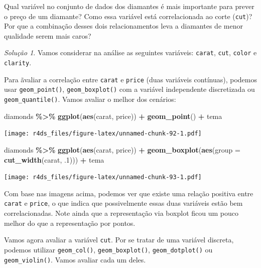 \documentclass[
]{latex/krantz}
\newenvironment{Shaded}{\begin{snugshade}}{\end{snugshade}}
\newcommand{\AttributeTok}[1]{\textcolor[rgb]{0.13,0.29,0.53}{#1}}
\newcommand{\DecValTok}[1]{\textcolor[rgb]{0.00,0.00,0.81}{#1}}
\newcommand{\FunctionTok}[1]{\textcolor[rgb]{0.13,0.29,0.53}{\textbf{#1}}}
\newcommand{\NormalTok}[1]{#1}
\newcommand{\SpecialCharTok}[1]{\textcolor[rgb]{0.81,0.36,0.00}{\textbf{#1}}}
\theoremstyle{definition}
\theoremstyle{definition}
\theoremstyle{definition}
\theoremstyle{definition}
\theoremstyle{remark}
\newtheorem*{solution}{Solução}
\begin{document}
Qual variável no conjunto de dados dos diamantes é mais importante para prever o preço de um diamante? Como essa variável está correlacionada ao corte (\texttt{cut})? Por que a combinação desses dois relacionamentos leva a diamantes de menor qualidade serem mais caros?

\begin{solution}
Vamos considerar na análise as seguintes variáveis: \texttt{carat}, \texttt{cut}, \texttt{color} e \texttt{clarity}.

Para ãvaliar a correlação entre \texttt{carat} e \texttt{price} (duas variáveis contínuas), podemos usar \texttt{geom\_point()}, \texttt{geom\_boxplot()} com a variável independente discretizada ou \texttt{geom\_quantile()}. Vamos avaliar o melhor dos cenários:

\begin{Shaded}
\begin{Highlighting}[]
\NormalTok{diamonds }\SpecialCharTok{\%\textgreater{}\%} 
    \FunctionTok{ggplot}\NormalTok{(}\FunctionTok{aes}\NormalTok{(carat, price)) }\SpecialCharTok{+}
        \FunctionTok{geom\_point}\NormalTok{() }\SpecialCharTok{+}
\NormalTok{        tema}
\end{Highlighting}
\end{Shaded}

\texttt{[image: r4ds\_files/figure-latex/unnamed-chunk-92-1.pdf]}

\begin{Shaded}
\begin{Highlighting}[]
\NormalTok{diamonds }\SpecialCharTok{\%\textgreater{}\%}
    \FunctionTok{ggplot}\NormalTok{(}\FunctionTok{aes}\NormalTok{(carat, price)) }\SpecialCharTok{+}
        \FunctionTok{geom\_boxplot}\NormalTok{(}\FunctionTok{aes}\NormalTok{(}\AttributeTok{group =} \FunctionTok{cut\_width}\NormalTok{(carat, .}\DecValTok{1}\NormalTok{))) }\SpecialCharTok{+}
\NormalTok{        tema}
\end{Highlighting}
\end{Shaded}

\texttt{[image: r4ds\_files/figure-latex/unnamed-chunk-93-1.pdf]}

Com base nas imagens acima, podemos ver que existe uma relação positiva entre \texttt{carat} e \texttt{price}, o que indica que possivelmente essas duas variáveis estão bem correlacionadas. Note ainda que a representação via boxplot ficou um pouco melhor do que a representação por pontos.

Vamos agora avaliar a variável \texttt{cut}. Por se tratar de uma variável discreta, podemos utilizar \texttt{geom\_col()}, \texttt{geom\_boxplot()}, \texttt{geom\_dotplot()} ou \texttt{geom\_violin()}. Vamos avaliar cada um deles.


\end{solution}
\end{document}
